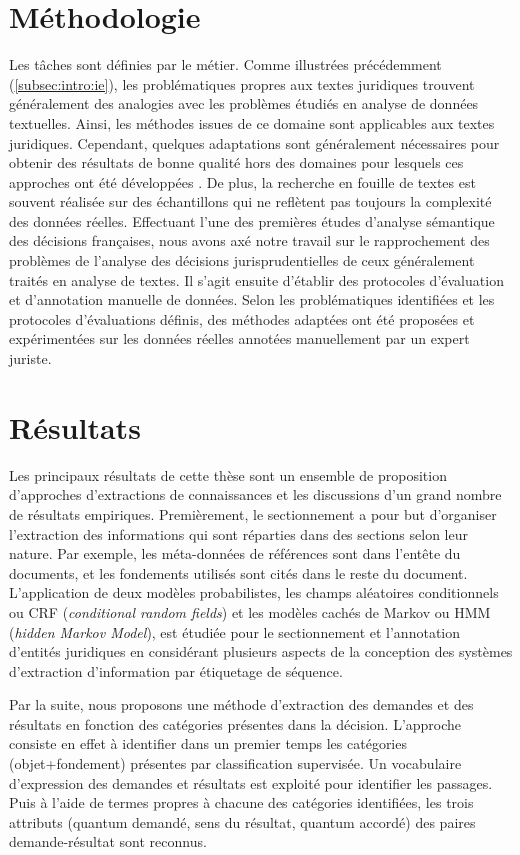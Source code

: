 \section{Méthodologie}
\label{sec:intro:methodologie}
Les tâches sont définies par le métier.
Comme illustrées précédemment (\ref{subsec:intro:ie}), les problématiques propres aux textes juridiques trouvent généralement des analogies avec les problèmes étudiés en analyse de données textuelles. Ainsi, les méthodes issues de ce domaine sont applicables aux textes juridiques. Cependant, quelques adaptations sont généralement nécessaires pour obtenir des résultats de bonne qualité hors des domaines pour lesquels ces approches ont été développées \citep{Waltl2016lexia}. De plus, la recherche en fouille de textes est souvent réalisée sur des échantillons qui ne reflètent pas toujours la complexité des données réelles. Effectuant l'une des premières études d'analyse sémantique des décisions françaises, nous avons axé notre travail sur le rapprochement des problèmes de l'analyse des décisions jurisprudentielles de ceux généralement traités en analyse de textes. Il s'agit ensuite d'établir des protocoles d'évaluation et d'annotation manuelle de données. Selon les problématiques identifiées et les protocoles d'évaluations définis, des méthodes adaptées ont été proposées et expérimentées sur les données réelles annotées manuellement par un expert juriste.

\section{Résultats}
\label{sec:intro:résultats}
Les principaux résultats de cette thèse sont un ensemble de proposition d'approches d'extractions de connaissances et les discussions d'un grand nombre de résultats empiriques. Premièrement, le sectionnement a pour but d'organiser l'extraction des informations qui sont réparties dans des sections selon leur nature. Par exemple, les méta-données de références sont dans l'entête du documents, et les fondements utilisés sont cités dans le reste du document. L'application de deux modèles probabilistes, les champs aléatoires conditionnels ou CRF (\textit{conditional random fields}) et les modèles cachés de Markov ou HMM (\textit{hidden Markov Model}), est étudiée pour le sectionnement et l'annotation d'entités juridiques en considérant plusieurs aspects de la conception des systèmes d'extraction d'information par étiquetage de séquence.

Par la suite, nous proposons une méthode d'extraction des demandes et des résultats en fonction des catégories présentes dans la décision. L'approche consiste en effet à identifier dans un premier temps les catégories (objet+fondement) présentes par classification supervisée. Un vocabulaire d'expression des demandes et résultats est exploité pour identifier les passages. Puis à l'aide de termes propres à chacune des catégories identifiées, les trois attributs (quantum demandé, sens du résultat, quantum accordé) des paires demande-résultat sont reconnus. 

